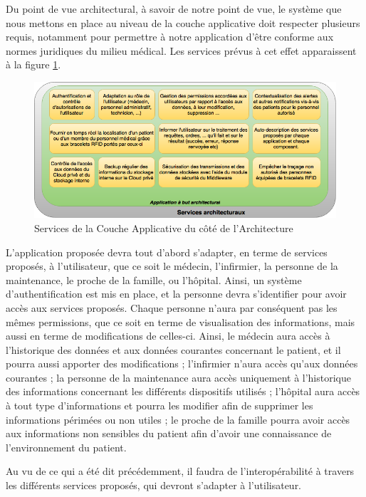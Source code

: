 Du point de vue architectural, à savoir de notre point de vue, le système que nous mettons en place au niveau de la couche applicative doit respecter plusieurs requis, notamment pour permettre à notre application d'être conforme aux normes juridiques du milieu médical. Les services prévus à cet effet apparaissent à la figure \ref{architecture}.
\\
\begin{figure}[h!]
	\hspace*{-2.5cm}
	\centering
	\includegraphics[width=1.4\textwidth]{architecture.png}
	\caption{Services de la Couche Applicative du côté de l'Architecture}
	\label{architecture}
\end{figure}

L'application proposée devra tout d'abord s’adapter, en terme de services proposés, à l’utilisateur, que ce soit le médecin, l'infirmier, la personne de la maintenance, le proche de la famille, ou l'hôpital. Ainsi, un système d’authentification est mis en place, et la personne devra s’identifier pour avoir accès aux services proposés. Chaque personne n’aura par conséquent pas les mêmes permissions, que ce soit en terme de visualisation des informations, mais aussi en terme de modifications de celles-ci. Ainsi, le médecin aura accès à l’historique des données et aux données courantes concernant le patient, et il pourra aussi apporter des modifications ; l’infirmier n’aura accès qu’aux données courantes ; la personne de la maintenance aura accès uniquement à l’historique des informations concernant les différents dispositifs utilisés ; l'hôpital aura accès à tout type d'informations et pourra les modifier afin de supprimer les informations périmées ou non utiles ; le proche de la famille pourra avoir accès aux informations non sensibles du patient afin d'avoir une connaissance de l'environnement du patient.

Au vu de ce qui a été dit précédemment, il faudra de l'interopérabilité à travers les différents services proposés, qui devront s'adapter à l'utilisateur.

